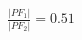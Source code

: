 \documentclass[preview]{standalone}
\begin{document}
\begin{align*}
\frac{|PF_1|}{|PF_2|} = 0.51
\end{align*}
\end{document}
